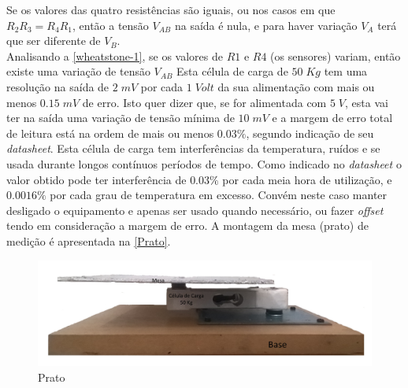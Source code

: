 \emptyline
\emptyline
Se os valores das quatro resistências são iguais, ou nos casos em que $R_2 R_3 = R_4 R_1$, então a tensão $V_{AB}$ na saída é nula, e para haver variação $V_A$ terá que ser diferente de $V_B$.\\
Analisando a \autoref{wheatstone-1}, se os valores de $R1$ e $R4$ (os sensores) variam, então existe uma variação de tensão $V_{AB}$
\emptyline
Esta célula de carga de $50 \; Kg$ tem uma resolução na saída de $2 \; mV$ por cada $1 \; Volt$ da sua alimentação com mais ou menos $0.15 \; mV$ de erro. Isto quer dizer que, se for alimentada com $5 \; V$, esta vai ter na saída uma variação de tensão mínima de $10 \; mV$ e a margem de erro total de leitura está na ordem de mais ou menos $0.03\%$, segundo indicação de seu \textit{datasheet}.
Esta célula de carga tem interferências da temperatura, ruídos e se usada durante longos contínuos períodos de tempo.
\emptyline
Como indicado no \textit{datasheet} o valor obtido pode ter interferência de $0.03\%$ por cada meia hora de utilização, e $0.0016\%$ por cada grau de temperatura em excesso. Convém neste caso manter desligado o equipamento e apenas ser usado quando necessário, ou fazer \textit{offset} tendo em consideração a margem de erro.
\emptyline
A montagem da mesa (prato) de medição é apresentada na \autoref{Prato}.
\emptyline
\begin{minipage}[!b]{\linewidth}
\begin{figure}[H]
	\centering
	\includegraphics[scale=0.14]{./image/PESTA/material/Prato-1.jpg}
	\caption{Prato}
	\label{Prato}
\end{figure}
\end{minipage}
